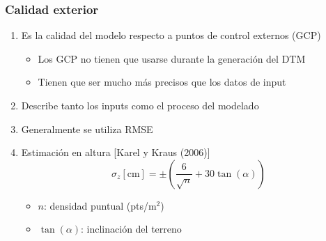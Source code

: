 \begin{frame}
  \frametitle{Calidad exterior}
  \begin{enumerate}
    \item Es la calidad del modelo respecto a puntos de control externos (GCP)
      \begin{itemize}
        \item Los GCP no tienen que usarse durante la generación del DTM
        \item Tienen que ser mucho más precisos que los datos de input
      \end{itemize}
    \item Describe tanto los inputs como el proceso del modelado
    \item Generalmente se utiliza \alert{RMSE}
    \item Estimación en \alert{altura} [Karel y Kraus (2006)]
        \[\sigma_z[\mathrm{cm}] = \pm\left(\dfrac{6}{\sqrt{n}} +
        30\tan(\alpha)\right)\]
      \begin{itemize}
        \item $n$: densidad puntual (pts/m$^2$)
        \item $\tan(\alpha)$: inclinación del terreno
      \end{itemize}
  \end{enumerate}
\end{frame}
